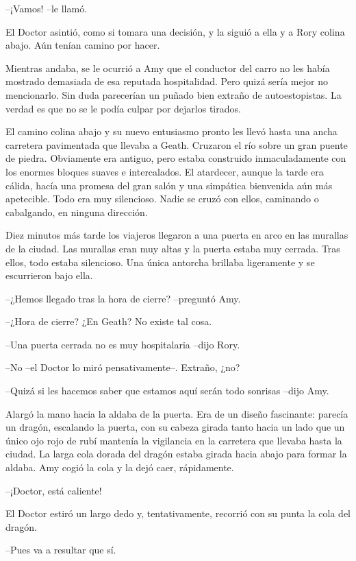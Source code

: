 {--¡Vamos! --le llamó.}

{El Doctor asintió, como si tomara una decisión, y la siguió a ella y a
Rory colina abajo. Aún tenían camino por hacer.}

{Mientras andaba, se le ocurrió a Amy que el conductor del carro no les
	había mostrado demasiada de esa reputada hospitalidad. Pero quizá sería
	mejor no mencionarlo. Sin duda parecerían un puñado bien extraño de
	autoestopistas. La verdad es que no se le podía culpar por dejarlos
tirados.}

{El camino colina abajo y su nuevo entusiasmo pronto les llevó hasta una
	ancha carretera pavimentada que llevaba a Geath. Cruzaron el río sobre
	un gran puente de piedra. Obviamente era antiguo, pero estaba construido
	inmaculadamente con los enormes bloques suaves e intercalados. El
	atardecer, aunque la tarde era cálida, hacía una promesa del gran salón
	y una simpática bienvenida aún más apetecible. Todo era muy silencioso.
Nadie se cruzó con ellos, caminando o cabalgando, en ninguna dirección.}

{Diez minutos más tarde los viajeros llegaron a una puerta en arco en
	las murallas de la ciudad. Las murallas eran muy altas y la puerta
	estaba muy cerrada. Tras ellos, todo estaba silencioso. Una única
antorcha brillaba ligeramente y se escurrieron bajo ella.}

{--¿Hemos llegado tras la hora de cierre? --preguntó Amy.}

{--¿Hora de cierre? ¿En Geath? No existe tal cosa.}

{--Una puerta cerrada no es muy hospitalaria --dijo Rory.}

{--No --el Doctor lo miró pensativamente--. Extraño, ¿no?}

{--Quizá si les hacemos saber que estamos aquí serán todo sonrisas
--dijo Amy.}

{Alargó la mano hacia la aldaba de la puerta. Era de un diseño
	fascinante: parecía un dragón, escalando la puerta, con su cabeza girada
	tanto hacia un lado que un único ojo rojo de rubí mantenía la vigilancia
	en la carretera que llevaba hasta la ciudad. La larga cola dorada del
	dragón estaba girada hacia abajo para formar la aldaba. Amy cogió la
cola y la dejó caer, rápidamente.}

{--¡Doctor, está caliente!}

{El Doctor estiró un largo dedo y, tentativamente, recorrió con su punta
la cola del dragón.}

{--Pues va a resultar que sí.}


